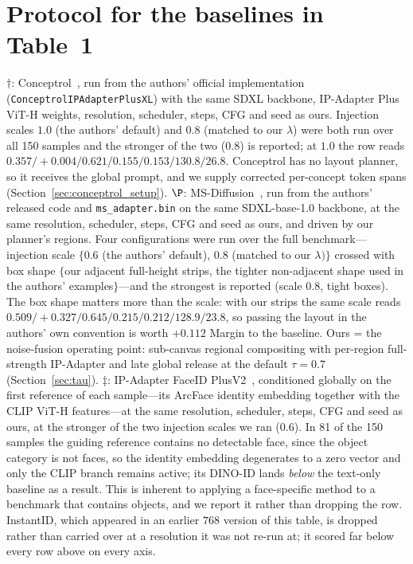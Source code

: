 \documentclass[review,10pt,times]{elsarticle}
\begin{document}
\section{Protocol for the baselines in Table~1}
\noindent
$\dagger$: Conceptrol~\cite{he2025conceptrol}, run from the authors'
  official implementation (\texttt{Conceptrol\allowbreak IPAdapter\allowbreak Plus\allowbreak XL}) with the same
  SDXL backbone, IP-Adapter Plus ViT-H weights, resolution, scheduler, steps,
  CFG and seed as ours.  Injection scales $1.0$ (the authors' default) and
  $0.8$ (matched to our $\lambda$) were both run over all 150 samples and the
  stronger of the two ($0.8$) is reported; at $1.0$ the row reads
  $0.357/{+}0.004/0.621/0.155/0.153/130.8/26.8$.  Conceptrol has no layout planner,
  so it receives the global prompt, and we supply corrected per-concept token
  spans (Section~\ref{sec:conceptrol_setup}).
  $\P$: MS-Diffusion~\cite{wang2025msdiffusion}, run from the authors'
  released code and \texttt{ms\_adapter.bin} on the same SDXL-base-1.0
  backbone, at the same resolution, scheduler, steps, CFG and seed as ours,
  and driven by our planner's regions.  Four configurations were run over the
  full benchmark---injection scale $\{0.6$ (the authors' default), $0.8$
  (matched to our $\lambda)\}$ crossed with box shape $\{$our adjacent
  full-height strips, the tighter non-adjacent shape used in the authors'
  examples$\}$---and the strongest is reported (scale $0.8$, tight boxes).
  The box shape matters more than the scale: with our strips the same scale
  reads $0.509/{+}0.327/0.645/0.215/0.212/128.9/23.8$, so passing the layout
  in the authors' own convention is worth $+0.112$ Margin to the baseline.
  Ours = the noise-fusion operating point: sub-canvas regional compositing
  with per-region full-strength
  IP-Adapter and late global release at the default $\tau{=}0.7$
  (Section~\ref{sec:tau}).
  $\ddagger$: IP-Adapter FaceID PlusV2~\cite{ye2023ip}, conditioned globally
  on the first reference of each sample---its ArcFace identity embedding
  together with the CLIP ViT-H features---at the same resolution, scheduler,
  steps, CFG and seed as ours, at the stronger of the two injection scales we
  ran ($0.6$).  In 81 of the 150 samples the guiding reference contains no
  detectable face, since the object category is not faces, so the identity
  embedding degenerates to a zero vector and only the CLIP branch remains
  active; its DINO-ID lands \emph{below} the text-only baseline as a result.
  This is inherent to applying a face-specific method to a benchmark that
  contains objects, and we report it rather than dropping the row.
  InstantID, which appeared in an earlier $768$ version of this table, is
  dropped rather than carried over at a resolution it was not re-run at; it
  scored far below every row above on every axis.



\end{document}

